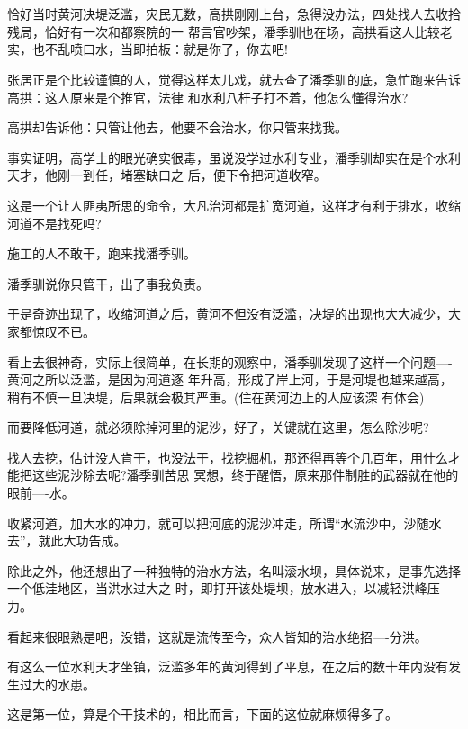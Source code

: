 \documentclass[11pt,a4paper,onecolumn]{article}
\begin{document}
\section[\thesection]{}

恰好当时黄河决堤泛滥，灾民无数，高拱刚刚上台，急得没办法，四处找人去收拾残局，恰好有一次和都察院的一
帮言官吵架，潘季驯也在场，高拱看这人比较老实，也不乱喷口水，当即拍板：就是你了，你去吧!

张居正是个比较谨慎的人，觉得这样太儿戏，就去查了潘季驯的底，急忙跑来告诉高拱：这人原来是个推官，法律
和水利八杆子打不着，他怎么懂得治水?

高拱却告诉他：只管让他去，他要不会治水，你只管来找我。

事实证明，高学士的眼光确实很毒，虽说没学过水利专业，潘季驯却实在是个水利天才，他刚一到任，堵塞缺口之
后，便下令把河道收窄。

这是一个让人匪夷所思的命令，大凡治河都是扩宽河道，这样才有利于排水，收缩河道不是找死吗?

施工的人不敢干，跑来找潘季驯。

潘季驯说你只管干，出了事我负责。

于是奇迹出现了，收缩河道之后，黄河不但没有泛滥，决堤的出现也大大减少，大家都惊叹不已。

看上去很神奇，实际上很简单，在长期的观察中，潘季驯发现了这样一个问题----黄河之所以泛滥，是因为河道逐
年升高，形成了岸上河，于是河堤也越来越高，稍有不慎一旦决堤，后果就会极其严重。(住在黄河边上的人应该深
有体会)

而要降低河道，就必须除掉河里的泥沙，好了，关键就在这里，怎么除沙呢?

找人去挖，估计没人肯干，也没法干，找挖掘机，那还得再等个几百年，用什么才能把这些泥沙除去呢?潘季驯苦思
冥想，终于醒悟，原来那件制胜的武器就在他的眼前----水。

收紧河道，加大水的冲力，就可以把河底的泥沙冲走，所谓``水流沙中，沙随水去''，就此大功告成。

除此之外，他还想出了一种独特的治水方法，名叫滚水坝，具体说来，是事先选择一个低洼地区，当洪水过大之
时，即打开该处堤坝，放水进入，以减轻洪峰压力。

看起来很眼熟是吧，没错，这就是流传至今，众人皆知的治水绝招----分洪。

有这么一位水利天才坐镇，泛滥多年的黄河得到了平息，在之后的数十年内没有发生过大的水患。

这是第一位，算是个干技术的，相比而言，下面的这位就麻烦得多了。

\section[\thesection]{}
\end{document}
